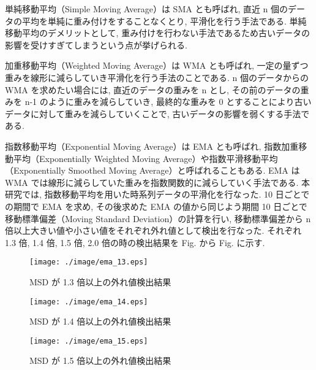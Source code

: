 単純移動平均（Simple Moving Average）は SMA とも呼ばれ, 直近 n 個のデータの平均を単純に重み付けをすることなくとり, 平滑化を行う手法である. 単純移動平均のデメリットとして, 重み付けを行わない手法であるため古いデータの影響を受けすぎてしまうという点が挙げられる. 

加重移動平均（Weighted Moving Average）は WMA とも呼ばれ, 一定の量ずつ重みを線形に減らしていき平滑化を行う手法のことである. 
n 個のデータからの WMA を求めたい場合には, 直近のデータの重みを n とし, その前のデータの重みを n-1 のように重みを減らしていき, 最終的な重みを 0 とすることにより古いデータに対して重みを減らしていくことで, 古いデータの影響を弱くする手法である. 

指数移動平均（Exponential Moving Average）は EMA とも呼ばれ, 
指数加重移動平均（Exponentially Weighted Moving Average）や指数平滑移動平均（Exponentially Smoothed Moving Average）と呼ばれることもある. 
EMA は WMA では線形に減らしていた重みを指数関数的に減らしていく手法である. 
本研究では, 指数移動平均を用いた時系列データの平滑化を行なった. 
10 日ごとでの期間で EMA を求め, その後求めた EMA の値から同じよう期間 10 日ごとで移動標準偏差（Moving Standard Deviation）の計算を行い, 移動標準偏差から n 倍以上大きい値や小さい値をそれぞれ外れ値として検出を行なった. 
それぞれ 1.3 倍, 1.4 倍, 1.5 倍, 2.0 倍の時の検出結果を Fig. から Fig. に示す. 

\begin{figure}[!b]
 \begin{center}
    \texttt{[image: ./image/ema\_13.eps]}
    \caption{MSD が 1.3 倍以上の外れ値検出結果}
 \end{center}
\end{figure}

\begin{figure}[!b]
 \begin{center}
    \texttt{[image: ./image/ema\_14.eps]}
    \caption{MSD が 1.4 倍以上の外れ値検出結果}
 \end{center}
\end{figure}

\begin{figure}[!b]
 \begin{center}
    \texttt{[image: ./image/ema\_15.eps]}
    \caption{MSD が 1.5 倍以上の外れ値検出結果}
 \end{center}
\end{figure}

